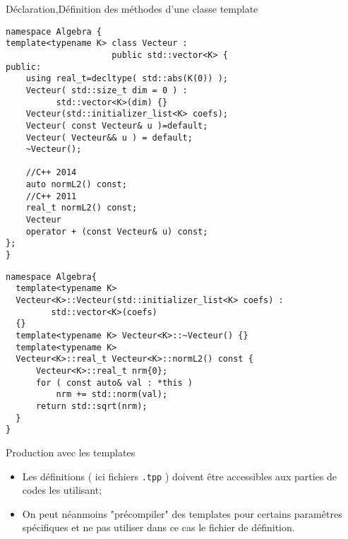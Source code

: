 \documentclass[handout,10pt]{beamer}
\begin{document}
\begin{frame}[fragile]{Déclaration,Définition des méthodes d'une classe template}
\tiny
\begin{minipage}{0.43\textwidth}
\begin{lstlisting}[caption={\tiny Vecteur.hpp}]
namespace Algebra {
template<typename K> class Vecteur : 
                     public std::vector<K> {
public:
    using real_t=decltype( std::abs(K(0)) );
    Vecteur( std::size_t dim = 0 ) :
          std::vector<K>(dim) {}
    Vecteur(std::initializer_list<K> coefs);
    Vecteur( const Vecteur& u )=default;
    Vecteur( Vecteur&& u ) = default;
    ~Vecteur();
    
    //C++ 2014
    auto normL2() const;
    //C++ 2011
    real_t normL2() const;
    Vecteur 
    operator + (const Vecteur& u) const;
};
}
\end{lstlisting}
\end{minipage}\hfill
\begin{minipage}{0.53\textwidth}
\begin{lstlisting}[caption={\tiny Vecteur.tpp}]
namespace Algebra{
  template<typename K> 
  Vecteur<K>::Vecteur(std::initializer_list<K> coefs) : 
         std::vector<K>(coefs)
  {}
  template<typename K> Vecteur<K>::~Vecteur() {}
  template<typename K> 
  Vecteur<K>::real_t Vecteur<K>::normL2() const {
      Vecteur<K>::real_t nrm{0};
      for ( const auto& val : *this ) 
          nrm += std::norm(val);
      return std::sqrt(nrm);
  }
}
\end{lstlisting}
\end{minipage}
\begin{block}{Production avec les templates}
\begin{itemize}
\item Les définitions ( ici fichiers \lstinline$.tpp$ ) doivent être accessibles aux parties de codes les utilisant;
\item On peut néanmoins "précompiler" des templates pour certains paramêtres spécifiques et ne pas utiliser dans ce cas
le fichier de définition.
\end{itemize}
\end{block}
\end{frame}
\end{document}
